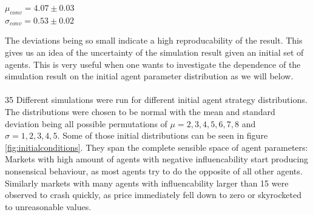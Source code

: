 \documentclass[11pt]{article}
\begin{document}
\begin{center}
  $\mu_{conv} = 4.07\pm 0.03$ \\
  $\sigma_{conv} = 0.53\pm 0.02$
\end{center}
The deviations being so small indicate a high reproducability of the result. This gives us an idea of the uncertainty of the simulation result given an initial set of agents. This is very useful when one wants to investigate the dependence of the simulation result on the initial agent parameter distribution as we will below. \\
\hfill \\
35 Different simulations were run for different initial agent strategy distributions. The distributions were chosen to be normal with the mean and standard deviation being all possible permutations of $\mu=2,3,4,5,6,7,8$ and $\sigma=1,2,3,4,5$. Some of those initial distributions can be seen in figure \ref{fig:initialconditions}. They span the complete sensible space of agent parameters: Markets with high amount of agents with negative influencability start producing nonsensical behaviour, as most agents try to do the opposite of all other agents. Similarly markets with many agents with influencability larger than 15 were observed to crash quickly, as price immediately fell down to zero or skyrocketed to unreasonable values. \\
\end{document}
